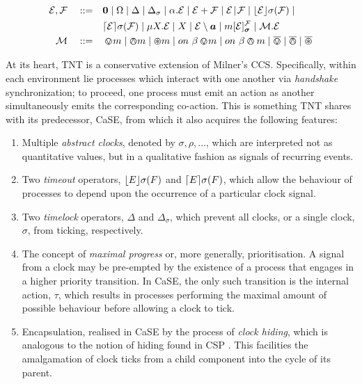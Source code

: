 \documentclass[orivec,envcountsame]{llncs}
\begin{document}
\begin{equation}
  \begin{aligned}
    \expr, \exprb \quad \mathrel{::=} \quad &
      \nil  \mid
      \Omega \mid
      \Delta \mid
      \Delta_{\sigma} \mid
      \alpha . \expr  \mid
      \expr + \exprb \mid
      \expr \mathrel{\!|\!} \exprb \mid
      \timeout{\expr}{\sigma}{\exprb} \mid \\
    & \stimeout{\expr}{\sigma}{\exprb} \mid 
      \mu X . \expr \mid
      X \mid 
      \expr \setminus \vec{a} \mid
      \locv{m}{\expr}{\exprb}{\vec{\sigma}} \mid
      \ambop . \expr \\
   \ambop \quad \mathrel{::=} \quad & \tntin{m} \mid \tntout{m} \mid \tntopen{m} \mid
      \procin{\beta}{m} \mid \procout{\beta}{m} \mid \bin \mid
      \bout \mid \bopen
   \end{aligned}
   \label{eqn:tnt-syntax}
\end{equation}


At its heart, TNT is a conservative extension of Milner's CCS.
Specifically, within each environment lie processes which interact with
one another via \emph{handshake} synchronization; to proceed, one
process must emit an action as another simultaneously emits the
corresponding co-action.  This is something TNT shares with its
predecessor, CaSE, from which it also acquires the following features:

\begin{enumerate}
\item Multiple \emph{abstract clocks}, denoted by $\sigma, \rho, \dots$,
      which are interpreted not as quantitative values, but in a
      qualitative fashion as signals of recurring events.
\item Two \emph{timeout} operators, $\lfloor{E}\rfloor {\sigma} ({F})$ and
      $\lceil{E}\rceil {\sigma} ({F})$, which allow the behaviour of
      processes to depend upon the occurrence of a particular clock
      signal.
\item Two \emph{timelock} operators, $\Delta$ and $\Delta_{\sigma}$,
      which prevent all clocks, or a single
      clock, $\sigma$, from ticking, respectively.
\item The concept of \emph{maximal progress} or, more generally,
      prioritisation.  A signal from a clock may be pre-empted by the
      existence of a process that engages in a higher priority
      transition.  In CaSE, the only such transition is the internal action,
      $\tau$, which results in processes performing the maximal amount
      of possible behaviour before allowing a clock to tick.
\item Encapsulation, realised in CaSE by the process of \emph{clock
      hiding}, which is analogous to the notion of hiding found in
      CSP \cite{hoare:csp78}.  This facilities the amalgamation of clock ticks
      from a child component into the cycle of its parent.
\end{enumerate}
\end{document}
